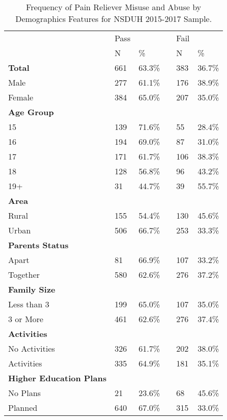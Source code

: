 \documentclass[sigconf]{acmart}
\begin{document}
\begin{table}
  \caption{Frequency of Pain Reliever Misuse and Abuse
  by Demographics Features for NSDUH 2015-2017 Sample.}
  \label{tab:freq}
  \begin{tabular}{llllll}
    \toprule
              & Pass & & & Fail & \\
              & N & \% &  & N & \% \\
    \midrule
    \textbf{Total} & 661 & 63.3\% & & 383 & 36.7\% \\
    \midrule
    Male      & 277 & 61.1\% & & 176 & 38.9\%  \\
    Female    & 384 & 65.0\% & & 207 & 35.0\%  \\
    \midrule
    \textbf{Age Group} &  &  &  &  & \\
    15     & 139 & 71.6\% & &  55 & 28.4\% \\
    16     & 194 & 69.0\% & &  87 & 31.0\% \\
    17     & 171 & 61.7\% & & 106 & 38.3\% \\
    18     & 128 & 56.8\% & &  96 & 43.2\% \\
    19+    & 31 &  44.7\% & &  39 & 55.7\% \\
    \midrule
    \textbf{Area} &  &  &  &  & \\
    Rural    & 155 & 54.4\% & & 130 & 45.6\%  \\
    Urban    & 506 & 66.7\% & & 253 & 33.3\%  \\ 
    \midrule
    \textbf{Parents Status} &  &  &  &  & \\
    Apart     &  81 & 66.9\% & & 107 & 33.2\%  \\
    Together  & 580 & 62.6\% & & 276 & 37.2\%  \\
    \midrule
    \textbf{Family Size} &  &  &  &  & \\
    Less than 3  & 199 & 65.0\% & & 107 & 35.0\%  \\
    3 or More    & 461 & 62.6\% & & 276 & 37.4\%  \\
    \midrule
    \textbf{Activities} &  &  &  &  & \\
    No Activities & 326 & 61.7\% & & 202 & 38.0\%  \\
    Activities    & 335 & 64.9\% & & 181 & 35.1\%  \\
    \midrule
    \textbf{Higher Education Plans} &  &  &  &  & \\
    No Plans  &  21 & 23.6\% & &  68 & 45.6\%  \\
    Planned   & 640 & 67.0\% & & 315 & 33.0\%  \\

\end{tabular}
\end{table}
\end{document}

